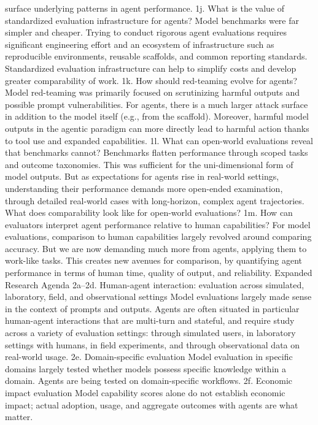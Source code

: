 surface underlying patterns in agent performance.
1j. What is the value of standardized
evaluation infrastructure for agents?
Model benchmarks were far simpler and cheaper. Trying to conduct
rigorous agent evaluations requires significant engineering effort and an
ecosystem of infrastructure such as reproducible environments, reusable
scaffolds, and common reporting standards. Standardized evaluation
infrastructure can help to simplify costs and develop greater
comparability of work.
1k. How should red-teaming evolve
for agents?
Model red-teaming was primarily focused on scrutinizing harmful
outputs and possible prompt vulnerabilities. For agents, there is a much
larger attack surface in addition to the model itself (e.g., from the
scaffold). Moreover, harmful model outputs in the agentic paradigm can
more directly lead to harmful action thanks to tool use and expanded
capabilities.
1l. What can open-world evaluations
reveal that benchmarks cannot?
Benchmarks flatten performance through scoped tasks and outcome
taxonomies. This was sufficient for the uni-dimensional form of model
outputs. But as expectations for agents rise in real-world settings,
understanding their performance demands more open-ended
examination, through detailed real-world cases with long-horizon,
complex agent trajectories. What does comparability look like for
open-world evaluations?
1m. How can evaluators interpret
agent performance relative to human
capabilities?
For model evaluations, comparison to human capabilities largely revolved
around comparing accuracy. But we are now demanding much more from
agents, applying them to work-like tasks. This creates new avenues for
comparison, by quantifying agent performance in terms of human time,
quality of output, and reliability.
Expanded Research Agenda
2a–2d. Human-agent interaction:
evaluation across simulated,
laboratory, field, and observational
settings
Model evaluations largely made sense in the context of prompts and
outputs. Agents are often situated in particular human-agent interactions
that are multi-turn and stateful, and require study across a variety of
evaluation settings: through simulated users, in laboratory settings with
humans, in field experiments, and through observational data on
real-world usage.
2e. Domain-specific evaluation
Model evaluation in specific domains largely tested whether models
possess specific knowledge within a domain. Agents are being tested on
domain-specific workflows.
2f. Economic impact evaluation
Model capability scores alone do not establish economic impact; actual
adoption, usage, and aggregate outcomes with agents are what matter.
